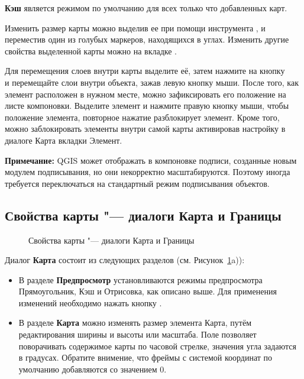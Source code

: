 \textbf{Кэш} является режимом по умолчанию для всех только что
добавленных карт.

Изменить размер карты можно выделив ее при помощи инструмента
,
и переместив один из голубых маркеров, находящихся в углах. Изменить
другие свойства выделенной карты можно на вкладке .

Для перемещения слоев внутри карты выделите её, затем нажмите на кнопку \\
 и
перемещайте слои внутри объекта, зажав левую кнопку мыши.
После того, как элемент расположен в нужном месте, можно зафиксировать
его положение на листе компоновки. Выделите элемент и нажмите правую
кнопку мыши, чтобы  положение
элемента, повторное нажатие разблокирует элемент. Кроме того, можно
заблокировать элементы внутри самой карты активировав настройку
 в диалоге Карта вкладки
Элемент.

\textbf{Примечание:} QGIS \CURRENT может отображать в компоновке подписи,
созданные новым модулем подписывания, но они некорректно масштабируются.
Поэтому иногда требуется переключаться на стандартный режим подписывания
объектов.

\subsection{Свойства карты "--- диалоги Карта и Границы}

\begin{figure}[ht]
  \centering
    \hspace{1cm}
  \caption{Свойства карты "--- диалоги Карта и Границы \nixcaption}\label{fig:mapdialog}
\end{figure}


Диалог \textbf{Карта} состоит из следующих разделов
(см. Рисунок~\ref{fig:mapdialog}a)):

\begin{itemize}[label=--]
\item В разделе \textbf{Предпросмотр} установливаются режимы
предпросмотра Прямоугольник, Кэш и Отрисовка, как описано выше. Для
применения изменений необходимо нажать кнопку .
\item В разделе \textbf{Карта} можно изменять размер элемента Карта,
путём редактирования ширины и высоты или масштаба. Поле
 позволяет поворачивать содержимое карты
по часовой стрелке, значения угла задаются в градусах. Обратите
внимение, что фреймы с системой координат по умолчанию добавляются со
значением 0.
\end{itemize}

